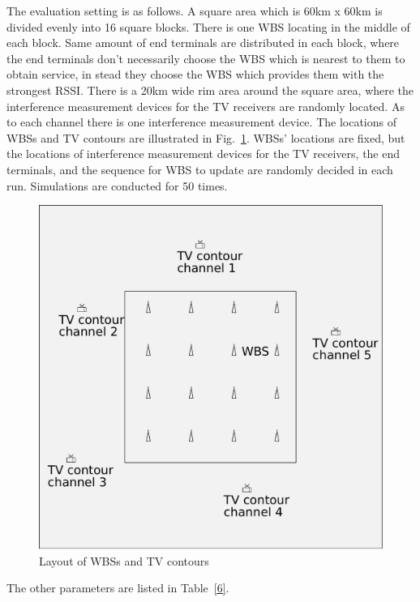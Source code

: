 \documentclass[times]{ettauth}
\theoremstyle{mytheoremstyle}
\theoremstyle{mytheoremstyle}
\theoremstyle{mytheoremstyle}
\begin{document}

The evaluation setting is as follows.
A square area which is 60km x 60km is divided evenly into 16 square blocks.
There is one WBS locating in the middle of each block.
Same amount of end terminals are distributed in each block, where the end terminals don't necessarily choose the WBS which is nearest to them to obtain service, in stead they choose the WBS which provides them with the strongest RSSI.
There is a 20km wide rim area around the square area, where the interference measurement devices for the TV receivers are randomly located.
As to each channel there is one interference measurement device.
The locations of WBSs and TV contours are illustrated in Fig.~\ref{sim:layout}.
WBSs' locations are fixed, but the locations of interference measurement devices for the TV receivers, the end terminals, and the sequence for WBS to update are randomly decided in each run.
Simulations are conducted for 50 times.

\begin{figure}[h!]
  \centering
  \includegraphics[width=0.5\linewidth]{layout.pdf}
  \caption{Layout of WBSs and TV contours}
  \label{sim:layout}
\end{figure}

The other parameters are listed in Table~\ref{6}.
\end{document}
